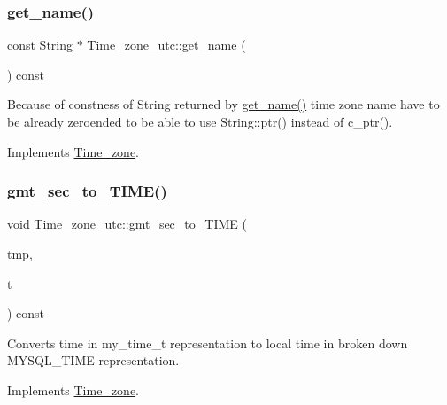 \subsubsection{\texorpdfstring{get\+\_\+name()}{get\_name()}}
{\footnotesize\ttfamily const String $\ast$ Time\+\_\+zone\+\_\+utc\+::get\+\_\+name (\begin{DoxyParamCaption}{ }\end{DoxyParamCaption}) const\hspace{0.3cm}{\ttfamily [virtual]}}

Because of constness of String returned by \mbox{\hyperlink{classTime__zone__utc_ae9e3ff6abe408adbb9005540ffee605c}{get\+\_\+name()}} time zone name have to be already zeroended to be able to use String\+::ptr() instead of c\+\_\+ptr(). 

Implements \mbox{\hyperlink{classTime__zone_a8116436f7b8e19dc4b99cd78a786e47f}{Time\+\_\+zone}}.

\mbox{\label{classTime__zone__utc_a7232c037e186e31d60dc46fda88541a9}} 
\subsubsection{\texorpdfstring{gmt\+\_\+sec\+\_\+to\+\_\+\+T\+I\+M\+E()}{gmt\_sec\_to\_TIME()}}
{\footnotesize\ttfamily void Time\+\_\+zone\+\_\+utc\+::gmt\+\_\+sec\+\_\+to\+\_\+\+T\+I\+ME (\begin{DoxyParamCaption}\item[{M\+Y\+S\+Q\+L\+\_\+\+T\+I\+ME $\ast$}]{tmp,  }\item[{my\+\_\+time\+\_\+t}]{t }\end{DoxyParamCaption}) const\hspace{0.3cm}{\ttfamily [virtual]}}

Converts time in my\+\_\+time\+\_\+t representation to local time in broken down M\+Y\+S\+Q\+L\+\_\+\+T\+I\+ME representation. 

Implements \mbox{\hyperlink{classTime__zone_a7a15d4406de10928f8e39eb3549770a4}{Time\+\_\+zone}}.

\mbox{\label{classTime__zone__utc_afe855f8afb56db1da43edd51b2340ad6}} 
